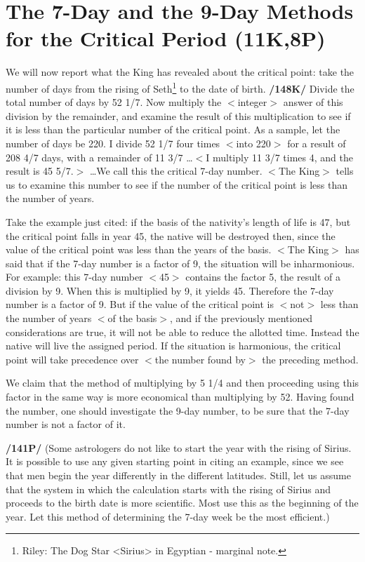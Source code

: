 \section{The 7-Day and the 9-Day Methods for the Critical Period (11K,8P)}

We will now report what the King has revealed about the critical point: take the number of days from the rising of Seth\footnote{Riley: The Dog Star <Sirius> in Egyptian - marginal note.} to the date of birth. \textbf{/148K/} Divide the total number of days by 52 1/7. Now multiply the $<$integer$>$ answer of this division by the remainder, and examine the result of this multiplication to see if it is less than the particular number of the critical point. As a sample, let the number of days be 220. I divide 52 1/7 four times $<$into 220$>$ for a result of 208 4/7 days, with a remainder of 11 3/7 \ldots $<$I multiply 11 3/7 times 4, and the result is 45 5/7.$>$ \ldots We call this the critical 7-day number.
$<$The King$>$ tells us to examine this number to see if the number of the critical point is less than the number of years. 

Take the example just cited: if the basis of the nativity’s length of life is 47, but the critical point falls in year 45, the native will be destroyed then, since the value of the critical point was less than the years of the basis. $<$The King$>$ has said that if the 7-day number is a factor of 9, the situation will be inharmonious. For example: this 7-day number $<$45$>$ contains the factor 5, the result of a division by
9. When this is multiplied by 9, it yields 45. Therefore the 7-day number is a factor of 9. But if the value of the critical point is $<$not$>$ less than the number of years $<$of the basis$>$, and if the previously mentioned considerations are true, it will not be able to reduce the allotted time. Instead the native will live the assigned period. If the situation is harmonious, the critical point will take precedence over $<$the
number found by$>$ the preceding method.

We claim that the method of multiplying by 5 1/4 and then proceeding using this factor in the same way is more economical than multiplying by 52. Having found the number, one should investigate the 9-day number, to be sure that the 7-day number is not a factor of it.

\textbf{/141P/} (Some astrologers do not like to start the year with the rising of Sirius. It is possible to use any given starting point in citing an example, since we see that men begin the year differently in the different latitudes. Still, let us assume that the system in which the calculation starts with the rising of Sirius and proceeds to the birth date is more scientific. Most use this as the beginning of the year. Let this method of determining the 7-day week be the most efficient.)

